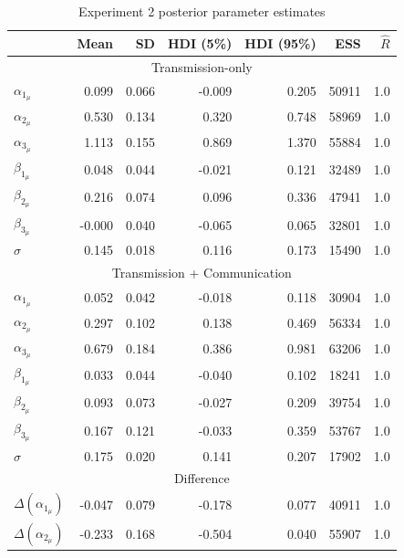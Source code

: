 \documentclass[doc,biblatex]{apa7}
\begin{document}
\clearpage

\begin{table}
\begin{center}
\begin{threeparttable}
\caption{Experiment 2 posterior parameter estimates}
\footnotesize
\begin{tabular}{lrrrrrr}
\toprule
 &   Mean &     SD &  HDI (5\%) &  HDI (95\%) &  ESS &  $\hat{R}$ \\
\midrule
\multicolumn{7}{c}{Transmission-only} \\
$\alpha_{1_\mu}$ &  0.099 &  0.066 &  -0.009 & 0.205 &   50911 &    1.0 \\
$\alpha_{2_\mu}$ &  0.530 &  0.134 &   0.320 & 0.748 &   58969 &    1.0 \\
$\alpha_{3_\mu}$ &  1.113 &  0.155 &   0.869 & 1.370 &   55884 &    1.0 \\
$\beta_{1_\mu}$  &  0.048 &  0.044 &  -0.021 & 0.121 &   32489 &    1.0 \\
$\beta_{2_\mu}$  &  0.216 &  0.074 &   0.096 & 0.336 &   47941 &    1.0 \\
$\beta_{3_\mu}$  & -0.000 &  0.040 &  -0.065 & 0.065 &   32801 &    1.0 \\
$\sigma$         &  0.145 &  0.018 &   0.116 & 0.173 &   15490 &    1.0 \\
\midrule
\multicolumn{7}{c}{Transmission + Communication} \\
$\alpha_{1_\mu}$ &  0.052 &  0.042 &  -0.018 & 0.118 &   30904 &    1.0 \\
$\alpha_{2_\mu}$ &  0.297 &  0.102 &   0.138 & 0.469 &   56334 &    1.0 \\
$\alpha_{3_\mu}$ &  0.679 &  0.184 &   0.386 & 0.981 &   63206 &    1.0 \\
$\beta_{1_\mu}$  &  0.033 &  0.044 &  -0.040 & 0.102 &   18241 &    1.0 \\
$\beta_{2_\mu}$  &  0.093 &  0.073 &  -0.027 & 0.209 &   39754 &    1.0 \\
$\beta_{3_\mu}$  &  0.167 &  0.121 &  -0.033 & 0.359 &   53767 &    1.0 \\
$\sigma$         &  0.175 &  0.020 &   0.141 & 0.207 &   17902 &    1.0 \\
\midrule
\multicolumn{7}{c}{Difference} \\
$\Delta(\alpha_{1_\mu})$ & -0.047 &  0.079 &  -0.178 &    0.077 &   40911 &    1.0 \\
$\Delta(\alpha_{2_\mu})$ & -0.233 &  0.168 &  -0.504 &    0.040 &   55907 &    1.0 \\

\end{tabular}
\end{threeparttable}
\end{center}
\end{table}
\end{document}
